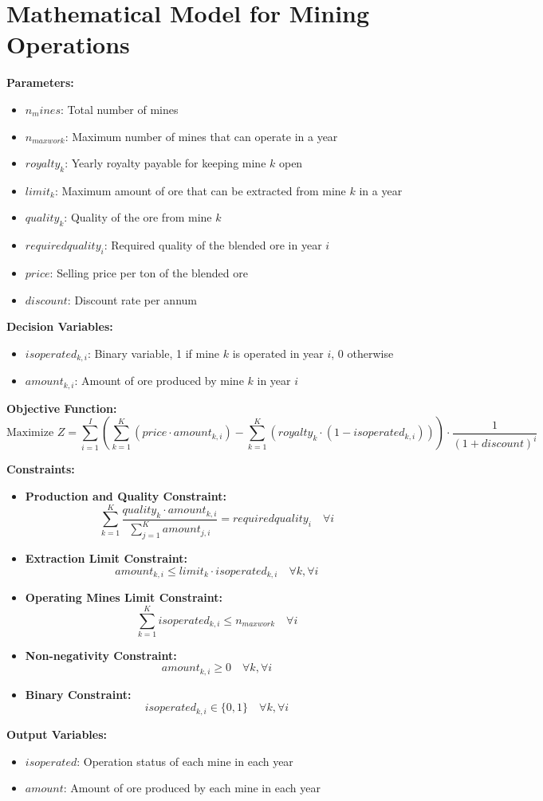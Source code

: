 \documentclass{article}
\begin{document}
\section*{Mathematical Model for Mining Operations}

\textbf{Parameters:}
\begin{itemize}
    \item $n_mines$: Total number of mines
    \item $n_{maxwork}$: Maximum number of mines that can operate in a year
    \item $royalty_k$: Yearly royalty payable for keeping mine $k$ open
    \item $limit_k$: Maximum amount of ore that can be extracted from mine $k$ in a year
    \item $quality_k$: Quality of the ore from mine $k$
    \item $requiredquality_i$: Required quality of the blended ore in year $i$
    \item $price$: Selling price per ton of the blended ore
    \item $discount$: Discount rate per annum
\end{itemize}

\textbf{Decision Variables:}
\begin{itemize}
    \item $isoperated_{k,i}$: Binary variable, 1 if mine $k$ is operated in year $i$, 0 otherwise
    \item $amount_{k,i}$: Amount of ore produced by mine $k$ in year $i$
\end{itemize}

\textbf{Objective Function:}
\[
\text{Maximize } Z = \sum_{i=1}^{I} \left( \sum_{k=1}^{K} (price \cdot amount_{k,i}) - \sum_{k=1}^{K} (royalty_k \cdot (1 - isoperated_{k,i})) \right) \cdot \frac{1}{(1 + discount)^i}
\]

\textbf{Constraints:}
\begin{itemize}
    \item \textbf{Production and Quality Constraint:}
    \[
    \sum_{k=1}^{K} \frac{quality_k \cdot amount_{k,i}}{\sum_{j=1}^{K} amount_{j,i}} = requiredquality_i \quad \forall i
    \]
    
    \item \textbf{Extraction Limit Constraint:}
    \[
    amount_{k,i} \leq limit_k \cdot isoperated_{k,i} \quad \forall k, \forall i
    \]
    
    \item \textbf{Operating Mines Limit Constraint:}
    \[
    \sum_{k=1}^{K} isoperated_{k,i} \leq n_{maxwork} \quad \forall i
    \]

    \item \textbf{Non-negativity Constraint:}
    \[
    amount_{k,i} \geq 0 \quad \forall k, \forall i
    \]
    
    \item \textbf{Binary Constraint:}
    \[
    isoperated_{k,i} \in \{0, 1\} \quad \forall k, \forall i
    \]
\end{itemize}

\textbf{Output Variables:}
\begin{itemize}
    \item $isoperated$: Operation status of each mine in each year
    \item $amount$: Amount of ore produced by each mine in each year
\end{itemize}
\end{document}
